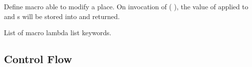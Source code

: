 \begin{LIST}{1cm}
  {
  Define macro  able to modify a place. On
  invocation of (  ), the value of
   applied to  and s will be stored into
   and returned.
  } 

  {List of macro lambda list keywords.
    }

\end{LIST}


\subsection{Control Flow}
